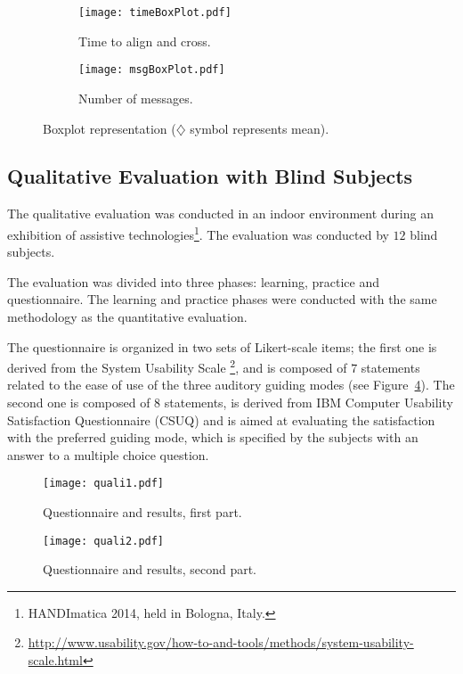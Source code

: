 \documentclass{article}
\begin{document}
\begin{figure}[t!]
        \centering
        \begin{subfigure}[b]{.5\textwidth}
                \texttt{[image: timeBoxPlot.pdf]}
                \caption{Time to align and cross.}
                \label{fig:timeBoxPlot}
        \end{subfigure}\begin{subfigure}[b]{.5\textwidth}
                \texttt{[image: msgBoxPlot.pdf]}
                \caption{Number of messages.}
                \label{fig:msgBoxPlot}
        \end{subfigure}
        \caption{Boxplot representation ($\diamondsuit$ symbol represents mean).}
        \label{fig:quali}
\end{figure}

\subsection{Qualitative Evaluation with Blind Subjects}
\label{sub:qualitative}
The qualitative evaluation was conducted in an indoor environment during an exhibition of assistive technologies\footnote{HANDImatica 2014, held in Bologna, Italy.}.
The evaluation was conducted by $12$ blind subjects.

The evaluation was divided into three phases: learning, practice and questionnaire. The learning and practice phases were conducted with the same methodology as the quantitative evaluation.

The questionnaire is organized in two sets of Likert-scale items; the first one is derived from the System Usability Scale
\footnote{\url{http://www.usability.gov/how-to-and-tools/methods/system-usability-scale.html}},
and is composed of $7$ statements related to the ease of use of the three auditory guiding modes (see  Figure~\ref{fig:quali1}).
The second one is composed of $8$ statements, is derived from IBM Computer Usability Satisfaction Questionnaire (CSUQ) \cite{lewis1995ibm} and is aimed at evaluating the satisfaction with the preferred guiding mode, which is specified by the subjects with an answer to a multiple choice question.

\begin{figure}[t!]
	\centering
		\texttt{[image: quali1.pdf]}
	\caption[]{Questionnaire and results, first part.}
	\label{fig:quali1}
\end{figure}

\begin{figure}[t!]
	\centering
		\texttt{[image: quali2.pdf]}
	\caption[]{Questionnaire and results, second part.}
	\label{fig:quali2}
\end{figure}
\end{document}
